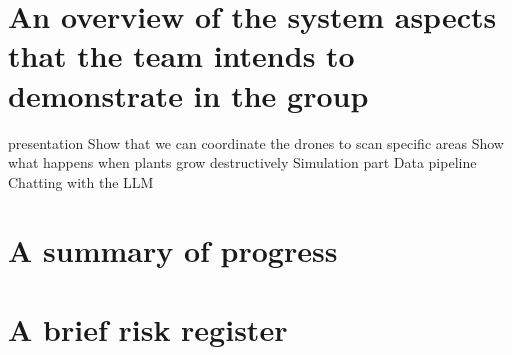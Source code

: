 \documentclass{article}
\begin{document}
\section{An overview of the system aspects that the team intends to demonstrate in the group}
presentation
    Show that we can coordinate the drones to scan specific areas
    Show what happens when plants grow destructively
        Simulation part
        Data pipeline 
    Chatting with the LLM


\section{A summary of progress}


\section{A brief risk register}

\end{document}
